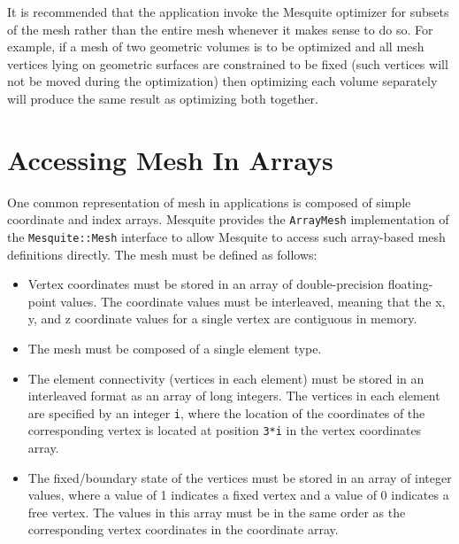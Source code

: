 It is recommended that the application invoke the Mesquite optimizer for subsets
of the mesh rather than the entire mesh whenever it makes sense to do so.  For
example, if a mesh of two geometric volumes is to be optimized and all mesh
vertices lying on geometric surfaces are constrained to be fixed (such vertices
will not be moved during the optimization) then optimizing each volume separately
will produce the same result as optimizing both together.  


\section{Accessing Mesh In Arrays} \label{sec::ArrayMesh}

One common representation of mesh in applications is composed of simple 
coordinate and index arrays.  Mesquite provides the \texttt{ArrayMesh} implementation of the \texttt{Mesquite::Mesh} interface to allow Mesquite
to access such array-based mesh definitions directly.  The mesh must be
defined as follows:
\begin{itemize}
\item Vertex coordinates must be stored in an array of double-precision
      floating-point values.  The coordinate values must be interleaved,
      meaning that the x, y, and z coordinate values for a single vertex
      are contiguous in memory.
\item The mesh must be composed of a single element type.
\item The element connectivity (vertices in each element) must be stored
      in an interleaved format as an array of long integers.  The vertices
      in each element are specified by an integer \texttt{i}, where the location       of the coordinates of the corresponding vertex is located at position
      \texttt{3*i} in the vertex coordinates array.
\item The fixed/boundary state of the vertices must be stored in an array
      of integer values, where a value of 1 indicates a fixed vertex and a 
      value of 0 indicates a free vertex.  The values in this array must
      be in the same order as the corresponding vertex coordinates in the
      coordinate array.
\end{itemize}

